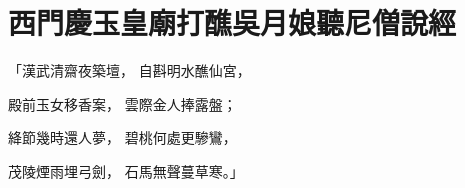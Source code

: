 %

\chapter{西門慶玉皇廟打醮\KG 吳月娘聽尼僧說經}


\begin{showcontents}{}




「漢武清齋夜築壇，  自斟明水醮仙宮，

殿前玉女移香案，  雲際金人捧露盤；

絳節幾時還人夢，  碧桃何處更驂鸞，

茂陵煙雨埋弓劍，  石馬無聲蔓草寒。」


\end{showcontents}
